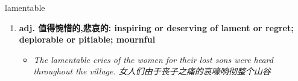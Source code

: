 
\begin{frame}
{\huge lamentable}
\begin{center}
\begin{enumerate}\Large
  \item \textbf{adj. 值得惋惜的,悲哀的: inspiring or deserving of lament or regret; deplorable or pitiable; mournful}
  \begin{itemize}
    \item \em{\Large{The lamentable cries of the women for their lost sons were heard throughout the village. 女人们由于丧子之痛的哀嚎响彻整个山谷}}
  \end{itemize}
\end{enumerate}
\end{center}
\end{frame}
